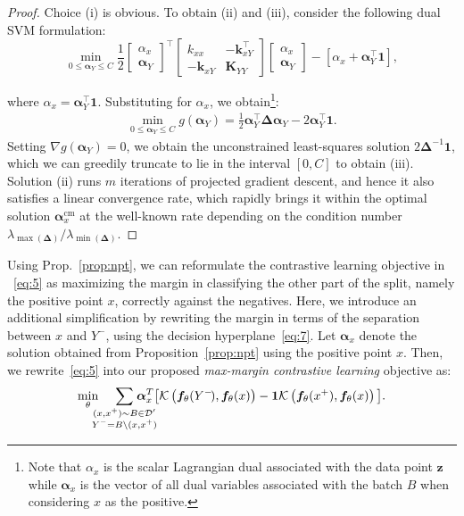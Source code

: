 \documentclass[letterpaper]{article} \usepackage{aaai22}  \usepackage{times}  \usepackage{helvet}  \usepackage{courier}  \usepackage[hyphens]{url}  \usepackage{graphicx} \urlstyle{rm} \def\UrlFont{\rm}  \usepackage{natbib}  \usepackage{caption} \DeclareCaptionStyle{ruled}{labelfont=normalfont,labelsep=colon,strut=off} \frenchspacing  \setlength{\pdfpagewidth}{8.5in}  \setlength{\pdfpageheight}{11in}
\newcommand{\vx}{x}\newcommand{\px}{x^+}\newcommand{\nx}{x^{-}} \newcommand{\vz}{\bm{z}}
\newcommand{\valpha}{\bm{\alpha}}
\newcommand{\one}{\bm{1}}
\newcommand{\dataset}{\mathcal{D}}
\newcommand{\kxx}{k_{xx}}
\newcommand{\kxy}{\bm{k}_{xY}}
\newcommand{\Kyy}{\bm{K}_{YY}}
\newcommand{\mDel}{\bm{\Delta}}
\newcommand{\nY}{Y^{-}}\newcommand{\mK}{\bm{K}}
\newcommand{\mY}{{Y}}
\newcommand{\batch}{B}
\newcommand{\kernel}{\mathcal{K}}
\newcommand{\half}{\tfrac{1}{2}}
\newcommand{\ft}{\bm{f}_\theta}
\begin{document}
\begin{proof}
Choice (i) is obvious. To obtain (ii) and (iii), consider the following dual SVM formulation:
\begin{equation*}
\min_{0\leq\valpha_{\mY}\leq C} \frac12 \left[\!\!\begin{array}{c}\alpha_x\\\valpha_{\mY}\end{array}\!\!\right]^{\top} \left[\!\!\begin{array}{cc}\kxx &-\kxy^{\top}\\-\kxy&\Kyy\end{array}\!\!\right]\left[\!\!\begin{array}{c}\alpha_x\\\valpha_{\mY}\end{array}\!\!\right] - \left[\alpha_x + \valpha_{\mY}^{\top}\one\right],
\end{equation*}

\noindent where $\alpha_x=\valpha_{\mY}^\top\one$. Substituting for $\alpha_x$, we obtain\footnote{Note that $\alpha_x$ is the scalar Lagrangian dual associated with the data point $\vz$ while $\valpha_{x}$ is the vector of all dual variables associated with the batch $\batch$ when considering $x$ as the positive.}:
\begin{align*}
\min_{0\leq\valpha_{\mY}\leq C} g(\valpha_{\mY}) =  \half\valpha_{\mY}^{\top}\mDel\valpha_{\mY} - 2\valpha_{\mY}^{\top}\one.
\end{align*}
Setting $\nabla g(\valpha_{\mY})=0$, we obtain the unconstrained least-squares solution $2\mDel^{-1}\one$, which we can greedily truncate to lie in the interval $[0,C]$ to obtain (iii). Solution (ii) runs $m$ iterations of projected gradient descent, and hence it also satisfies a linear convergence rate, which rapidly brings it within the optimal solution $\valpha_{\vx}^{\text{cm}}$ at the well-known rate depending on the condition number $\lambda_{\max(\mDel)}/\lambda_{\min(\mDel)}$.
\end{proof}
Using Prop.~\ref{prop:npt}, we can reformulate the contrastive learning objective in ~\eqref{eq:5} as maximizing the margin in classifying the other part of the split, namely the positive point $\vx$, correctly against the negatives. Here, we introduce an additional simplification by rewriting the margin in terms of the separation between $\vx$ and $\nY$, using the decision hyperplane~\eqref{eq:7}. Let $\valpha_x$ denote the solution obtained from Proposition~\ref{prop:npt} using the positive point $\vx$. Then, we rewrite~\eqref{eq:5} into our proposed \emph{max-margin contrastive learning} objective as:
\begin{equation} 
\min_{\theta}\hspace{-7pt}\sum_{\substack{(\vx,\px)\sim\batch\in\dataset'\\\nY=\batch\backslash(\vx,\px)}}\hspace{-18pt}\valpha_{x}^T \big[\kernel\left(\ft(\nY\!),\ft(\vx)\right) - 
    \one\kernel\left(\ft(\px), \ft(\vx)\right)\big].
    \label{eq:mmcl}
\end{equation}
\end{document}

